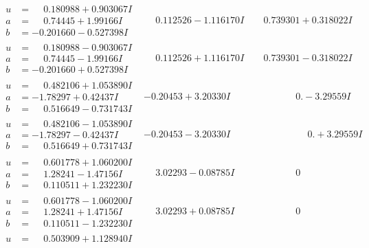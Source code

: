 \documentclass[1p]{elsarticle_modified}
\theoremstyle{definition}
\begin{document}
$$\begin{array}{c|c|c}
 \hline 
\begin{aligned}
u &= \phantom{-}0.180988 + 0.903067 I \\
a &= \phantom{-}0.74445 + 1.99166 I \\
b &= -0.201660 - 0.527398 I\end{aligned}
 & \phantom{-}0.112526 - 1.116170 I & \phantom{-}0.739301 + 0.318022 I \\ \hline\begin{aligned}
u &= \phantom{-}0.180988 - 0.903067 I \\
a &= \phantom{-}0.74445 - 1.99166 I \\
b &= -0.201660 + 0.527398 I\end{aligned}
 & \phantom{-}0.112526 + 1.116170 I & \phantom{-}0.739301 - 0.318022 I \\ \hline\begin{aligned}
u &= \phantom{-}0.482106 + 1.053890 I \\
a &= -1.78297 + 0.42437 I \\
b &= \phantom{-}0.516649 - 0.731743 I\end{aligned}
 & -0.20453 + 3.20330 I & \phantom{-0.000000 } 0. - 3.29559 I \\ \hline\begin{aligned}
u &= \phantom{-}0.482106 - 1.053890 I \\
a &= -1.78297 - 0.42437 I \\
b &= \phantom{-}0.516649 + 0.731743 I\end{aligned}
 & -0.20453 - 3.20330 I & \phantom{-0.000000 -}0. + 3.29559 I \\ \hline\begin{aligned}
u &= \phantom{-}0.601778 + 1.060200 I \\
a &= \phantom{-}1.28241 - 1.47156 I \\
b &= \phantom{-}0.110511 + 1.232230 I\end{aligned}
 & \phantom{-}3.02293 - 0.08785 I & \phantom{-0.000000 } 0 \\ \hline\begin{aligned}
u &= \phantom{-}0.601778 - 1.060200 I \\
a &= \phantom{-}1.28241 + 1.47156 I \\
b &= \phantom{-}0.110511 - 1.232230 I\end{aligned}
 & \phantom{-}3.02293 + 0.08785 I & \phantom{-0.000000 } 0 \\ \hline\begin{aligned}
u &= \phantom{-}0.503909 + 1.128940 I \\

\end{aligned}
\end{array}$$
\end{document}
